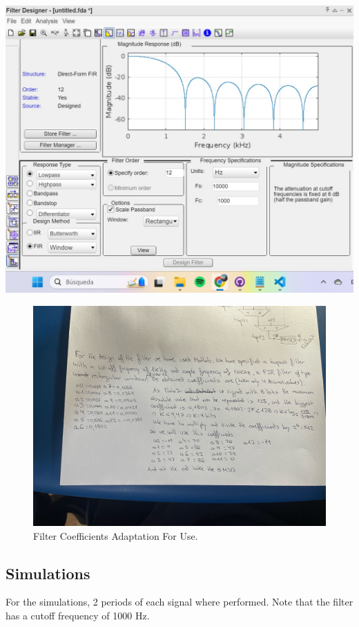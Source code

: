 \documentclass[a4paper, 12pt]{article}
\begin{document}
\begin{center}
\includegraphics[width=.9\linewidth]{./img/filter_coefficient_matlab.jpg}
\end{center}

\begin{figure}[htbp]
\centering
\includegraphics[width=.9\linewidth]{./img/filter_coefficient_calculations.jpg}
\caption{Filter Coefficients Adaptation For Use.}
\end{figure}
\subsection{Simulations}
\label{sec:orgfa45d68}

For the simulations, 2 periods of each signal where performed. Note that the filter has a cutoff frequency of 1000 Hz.
\end{document}
